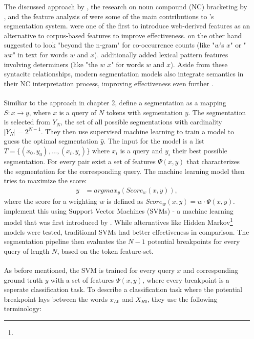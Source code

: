 The discussed approach by \citet{Risvik:2003}, the research on noun compound (NC) bracketing by \citet{Nakov:2005}, and the feature analysis of \citet{Keller:2003} were some of the main contributions to \citeauthor{Bergsma:2007}'s segmentation system. \citeauthor{Keller:2003} were one of the first to introduce web-derived features as an alternative to corpus-based features to improve effectiveness. \citeauthor{Nakov:2005} on the other hand suggested to look "beyond the n-gram" for co-occurrence counts (like "$w$'s $x$" or "$wx$" in text for words $w$ and $x$).
\citeauthor{Nicholson:2005} additionally added lexical pattern features involving determiners (like "the $w$ $x$" for words $w$ and $x$). Aside from these syntacitc relationships, modern segmentation models also integrate semantics in their NC interpretation process, improving effectiveness even further \cite{Girju:2005}.\\
\\
Similiar to the approach in chapter 2, \citeauthor{Bergsma:2007} define a segmentation as a mapping $S: x \to y$, where $x$ is a query of $N$ tokens with segmentation $y$. The segmentation is selected from $Y_N$, the set of all possible segmentations with cardinality $|Y_N| = 2^{N-1}$. They then use supervised machine learning to train a model to guess the optimal segmentation $\hat{y}$. The input for the model is a list $T = \{(x_0, y_0), ..., (x_i, y_i)\}$ where $x_i$ is a query and $y_i$ their best possible segmentation. For every pair exist a set of features $\Psi(x,y)$ that characterizes the segmentation for the corresponding query. The machine learning model then tries to maximize the score:
\begin{align*}
	\hat{y} &= argmax_y(Score_w(x,y)),
\end{align*}
where the score for a weighting $w$ is defined as $Score_w(x,y) = w \cdot \Psi(x,y)$. \citeauthor{Bergsma:2007} implement this using Support Vector Machines (SVMs) - a machine learning model that was first introduced by \citet{Joachims:2002}. While alternatives like Hidden Markov\footnote{} models were tested, traditional SVMs had better effectiveness in comparison. The segmentation pipeline then evaluates the $N-1$ potential breakpoints for every query of length $N$, based on the token feature-set.\\
\\
As before mentioned, the SVM is trained for every query $x$ and corresponding ground truth $y$ with a set of features $\Psi(x,y)$, where every breakpoint is a seperate classification task. To describe a classification task where the potential breakpoint lays between the words $x_{L0}$ and $X_{R0}$, they use the following terminology:
